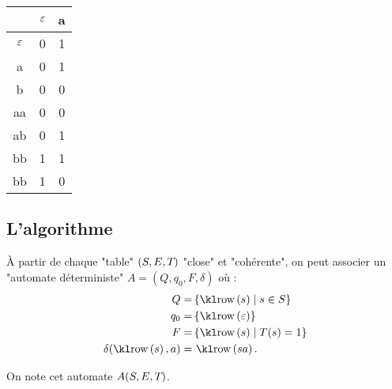 \begin{exemple}
\begin{itemize}
		      \begin{center}
			      \begin{tabular}{c|c|c}
				                 & $\varepsilon$ & a \\ \hline
				      $\varepsilon$ & 0          & 1 \\
				      a          & 0          & 1 \\
				      b          & 0          & 0 \\ \hline

				      aa         & 0          & 0 \\
				      ab         & 0          & 1 \\
				      bb         & 1          & 1 \\
				      bb         & 1          & 0 \\
			      \end{tabular}
		      \end{center}
	\end{itemize}
\end{exemple}


\subsection{L'algorithme}

\begin{construction}\label{thm:automata-tables}
	À partir de chaque "table" $(S, E, T_{})$ "close" et "cohérente", on peut associer un "automate déterministe" $A = (Q, q_0, F, \delta)$ où :
	$$
		\begin{aligned}
			Q                   = & \setdef{ \row{s}} {s \in S }  \\
			q_0                 = & \set{ \row{\motvide} }        \\
			F                   = & \setdef{ \row{s} }{T(s) = 1 } \\
			\delta(\row{s}, a)  = & \  \row{sa}.
		\end{aligned}
	$$

	On note cet automate $A(S, E, T_{})$.
\end{construction}

